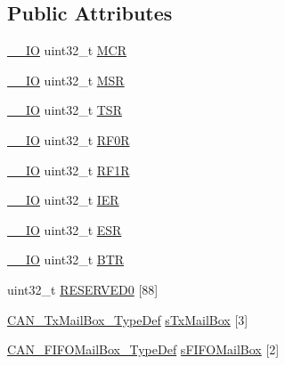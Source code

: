 \subsection*{Public Attributes}
\begin{DoxyCompactItemize}
\item 
\hyperlink{core__sc300_8h_aec43007d9998a0a0e01faede4133d6be}{\+\_\+\+\_\+\+IO} uint32\+\_\+t \hyperlink{struct_c_a_n___type_def_a1282eee79a22003257a7a5daa7f4a35f}{M\+CR}
\item 
\hyperlink{core__sc300_8h_aec43007d9998a0a0e01faede4133d6be}{\+\_\+\+\_\+\+IO} uint32\+\_\+t \hyperlink{struct_c_a_n___type_def_af98b957a4e887751fbd407d3e2cf93b5}{M\+SR}
\item 
\hyperlink{core__sc300_8h_aec43007d9998a0a0e01faede4133d6be}{\+\_\+\+\_\+\+IO} uint32\+\_\+t \hyperlink{struct_c_a_n___type_def_acbc82ac4e87e75350fc586be5e56d95b}{T\+SR}
\item 
\hyperlink{core__sc300_8h_aec43007d9998a0a0e01faede4133d6be}{\+\_\+\+\_\+\+IO} uint32\+\_\+t \hyperlink{struct_c_a_n___type_def_ad8e858479e26ab075ee2ddb630e8769d}{R\+F0R}
\item 
\hyperlink{core__sc300_8h_aec43007d9998a0a0e01faede4133d6be}{\+\_\+\+\_\+\+IO} uint32\+\_\+t \hyperlink{struct_c_a_n___type_def_a69a528d1288c1de666df68655af1d20e}{R\+F1R}
\item 
\hyperlink{core__sc300_8h_aec43007d9998a0a0e01faede4133d6be}{\+\_\+\+\_\+\+IO} uint32\+\_\+t \hyperlink{struct_c_a_n___type_def_a530babbc4b9584c93a1bf87d6ce8b8dc}{I\+ER}
\item 
\hyperlink{core__sc300_8h_aec43007d9998a0a0e01faede4133d6be}{\+\_\+\+\_\+\+IO} uint32\+\_\+t \hyperlink{struct_c_a_n___type_def_ab1a1b6a7c587443a03d654d3b9a94423}{E\+SR}
\item 
\hyperlink{core__sc300_8h_aec43007d9998a0a0e01faede4133d6be}{\+\_\+\+\_\+\+IO} uint32\+\_\+t \hyperlink{struct_c_a_n___type_def_accad1e4155459a13369f5ad0e7c6da29}{B\+TR}
\item 
uint32\+\_\+t \hyperlink{struct_c_a_n___type_def_ad0cc7fb26376c435bbf148e962739337}{R\+E\+S\+E\+R\+V\+E\+D0} \mbox{[}88\mbox{]}
\item 
\hyperlink{struct_c_a_n___tx_mail_box___type_def}{C\+A\+N\+\_\+\+Tx\+Mail\+Box\+\_\+\+Type\+Def} \hyperlink{struct_c_a_n___type_def_a328925e230f68a775f6f4ad1076c27ce}{s\+Tx\+Mail\+Box} \mbox{[}3\mbox{]}
\item 
\hyperlink{struct_c_a_n___f_i_f_o_mail_box___type_def}{C\+A\+N\+\_\+\+F\+I\+F\+O\+Mail\+Box\+\_\+\+Type\+Def} \hyperlink{struct_c_a_n___type_def_aa6053bc607535d9ecf7a3d887c0cc053}{s\+F\+I\+F\+O\+Mail\+Box} \mbox{[}2\mbox{]}

\end{DoxyCompactItemize}
